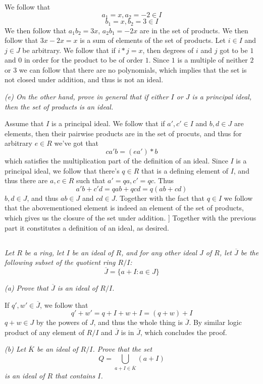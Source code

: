 \documentclass[11pt,oneside,titlepage]{book}
\newcommand{\set}[1]{\{ #1 \}}
\begin{document}
We follow that
$$a_1 = x, a_2 = -2 \in I$$
$$b_1 = x, b_2 = 3 \in I$$
We then follow that $a_1 b_2 = 3x$, $a_2 b_1 = -2x$ are in the set of
products. We then follow that $3x - 2x = x$ is a sum of elements of
the set of products. Let $i \in I$ and $j \in J$ be arbitrary.  We
follow that if $i * j = x$, then degrees of $i$ and $j$ got to be $1$
and $0$ in order for the product to be of order $1$.  Since $1$ is a
multiple of neither $2$ or $3$ we can follow that there are no
polynomials, which implies that the set is not closed under addition,
and thus is not an ideal.

\textit{(e) On the other hand, prove in general that if either $I$ or
$J$ is a principal ideal, then the set of products is an ideal.}

Assume that $I$ is a principal ideal. We follow that if $a', c' \in I$
and $b, d \in J$ are elements, then their pairwise products are in the
set of procuts, and thus for arbitrary $e \in R$ we've got that
$$c a'b = (ea') * b$$
which satisfies the multiplication part of the definition of an ideal.
Since $I$ is a principal ideal, we follow that there's $q \in R$ that
is a defining element of $I$, and thus there are $a, c \in R$ such
that $a' = qa, c' = qc$. Thus
$$a'b + c'd = qab + qcd = q(ab + cd)$$
$b, d \in J$, and thus $ab \in J$ and $cd \in J$. Together with the
fact that $q \in I$ we follow that the abovementioned element is
indeed an element of the set of products, which gives us the closure
of the set under addition. ] Together with the previous part it
constitutes a definition of an ideal, as desired.

\subsection{}

\textit{Let $R$ be a ring, let $I$ be an ideal of $R$, and for any
other ideal $J$ of $R$, let $\overline{J}$ be the following subset of
the quotient ring $R/I$:
  $$\overline{J} = \set{a + I: a \in J}$$}

\textit{(a) Prove that $\overline{J}$ is an ideal of $R/I$.}

If $q', w' \in \overline{J}$, we follow that
$$q' + w' = q + I + w + I = (q + w) + I$$
$q + w \in J$ by the powers of $J$, and thus the whole thing is
$\overline{J}$. By similar logic product of any element of $R/I$ and
$\overline{J}$ is in $\overline{J}$, which concludes the proof.

\textit{(b) Let $\overline{K}$ be an ideal of $R/I$. Prove that the
set
  $$Q = \bigcup_{a + I \in \overline{K}}{(a + I)}$$
  is an ideal of $R$ that contains $I$.}
\end{document}
